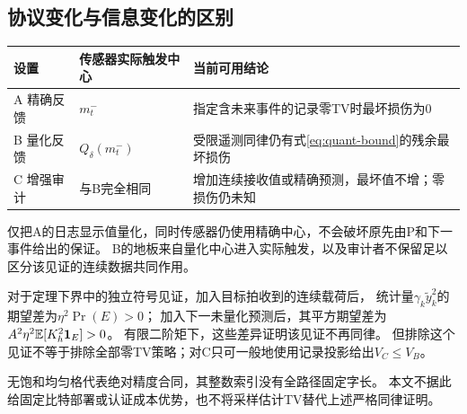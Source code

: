 \subsection{协议变化与信息变化的区别}
\begin{center}\small
\begin{tabularx}{\linewidth}{lXX}
\toprule
设置 & 传感器实际触发中心 & 当前可用结论\\
\midrule
A 精确反馈 & $m_t^-$ & 指定含未来事件的记录零TV时最坏损伤为0\\
B 量化反馈 & $Q_\delta(m_t^-)$ & 受限遥测同律仍有式\eqref{eq:quant-bound}的残余最坏损伤\\
C 增强审计 & 与B完全相同 & 增加连续接收值或精确预测，最坏值不增；零损伤仍未知\\
\bottomrule
\end{tabularx}
\end{center}
仅把A的日志显示值量化，同时传感器仍使用精确中心，不会破坏原先由P和下一事件给出的保证。
B的地板来自量化中心进入实际触发，以及审计者不保留足以区分该见证的连续数据共同作用。

对于定理下界中的独立符号见证，加入目标拍收到的连续载荷后，
统计量$\gamma_k\tilde y_k^2$的期望差为$\eta^2\Pr(E)>0$；
加入下一未量化预测后，其平方期望差为$A^2\eta^2\mathbb E[K_h^2\mathbf 1_E]>0$。
有限二阶矩下，这些差异证明该见证不再同律。
但排除这个见证不等于排除全部零TV策略；对C只可一般地使用记录投影给出$V_C\le V_B$。

无饱和均匀格代表绝对精度合同，其整数索引没有全路径固定字长。
本文不据此给固定比特部署或认证成本优势，也不将采样估计TV替代上述严格同律证明。
